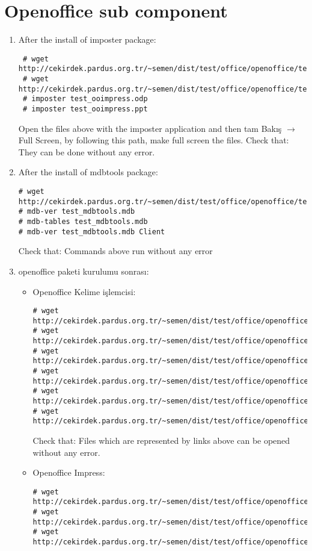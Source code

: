 \documentclass[a4paper,10pt]{article}
\begin{document}
\section{Openoffice sub component}
\begin{enumerate}
 \item After the install of imposter package:
\begin{verbatim}
 # wget http://cekirdek.pardus.org.tr/~semen/dist/test/office/openoffice/test_ooimpress.odp
 # wget http://cekirdek.pardus.org.tr/~semen/dist/test/office/openoffice/test_ooimpress.ppt
 # imposter test_ooimpress.odp
 # imposter test_ooimpress.ppt
\end{verbatim}
Open the files above with the imposter application and then tam Bakış $\rightarrow$ Full Screen, by following this path, make full screen the files. Check that: They can be done without any error.

 \item After the install of mdbtools package:
\begin{verbatim}
# wget http://cekirdek.pardus.org.tr/~semen/dist/test/office/openoffice/test_mdbtools.mdb
# mdb-ver test_mdbtools.mdb
# mdb-tables test_mdbtools.mdb
# mdb-ver test_mdbtools.mdb Client
\end{verbatim}

Check that: Commands above run without any error

\item openoffice paketi kurulumu sonrası:
\begin{itemize}
\item Openoffice Kelime işlemcisi:
\begin{verbatim}
# wget http://cekirdek.pardus.org.tr/~semen/dist/test/office/openoffice/test_oowriter.doc
# wget http://cekirdek.pardus.org.tr/~semen/dist/test/office/openoffice/test_oowriter.odt
# wget http://cekirdek.pardus.org.tr/~semen/dist/test/office/openoffice/test_oowriter.sxw
# wget http://cekirdek.pardus.org.tr/~semen/dist/test/office/openoffice/test_oowriter.txt
# wget http://cekirdek.pardus.org.tr/~semen/dist/test/office/openoffice/test_oowriter.ott
# wget http://cekirdek.pardus.org.tr/~semen/dist/test/office/openoffice/test_oowriter.html
\end{verbatim}

Check that: Files which are represented by links above can be opened without any error.

\item Openoffice Impress:
\begin{verbatim}
# wget http://cekirdek.pardus.org.tr/~semen/dist/test/office/openoffice/test_ooimpress.odp
# wget http://cekirdek.pardus.org.tr/~semen/dist/test/office/openoffice/test_ooimpress.ppt
# wget http://cekirdek.pardus.org.tr/~semen/dist/test/office/openoffice/test_ooimpress.pot
\end{verbatim}


\end{itemize}
\end{enumerate}
\end{document}
